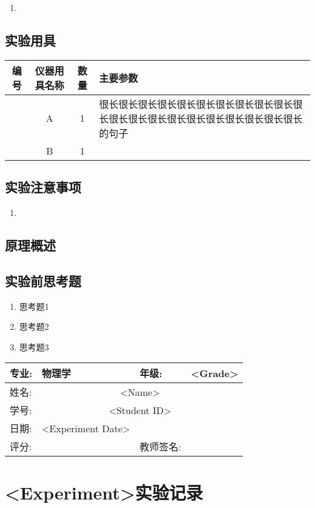 \documentclass{ctexart}
\newcommand{\experimentname}{<Experiment>}
\newcommand{\student}{<Name>}
\newcommand{\Grade}{<Grade>}
\newcommand{\stuID}{<Student ID>}
\newcommand{\experimentdate}{<Experiment Date>}
\theoremstyle{ansstyle}
\newcommand{\experimentdata}{%
    \begin{center}
        \begin{tabular}{|p{2cm}|p{4cm}|p{4cm}|p{4cm}|}
            \hline
            专业:  & 物理学 & 年级:  & \Grade \\
            \hline
            姓名:  & \multicolumn{3}{c|}{\student} \\
            \hline 
            学号:  & \multicolumn{3}{c|}{\stuID} \\
            \hline
            日期:  & \experimentdate & & \\
            \hline
            评分:  &   & 教师签名: & \\
            \hline
        \end{tabular}
    \end{center}%
}
\newcounter{instruCounter}
\newcommand{\instrument}[3]{%
        \stepcounter{instruCounter}\theinstruCounter &%
        #1 &%
        #2 &%
        #3 \\
        \hline
        }
\begin{document}
\begin{enumerate}
    \item 
\end{enumerate}

\subsection{实验用具}
\begin{table}[H]
    \begin{center}
        \begin{tabular}{|c|c|c|m{12cm}|}
            \hline
            编号 & 仪器用具名称 & 数量 & 主要参数 \\
            \hline
            \instrument{A}{1}{很长很长很长很长很长很长很长很长很长很长很长很长很长很长很长很长很长很长很长很长很长的句子} %
            \instrument{B}{1}{}
        \end{tabular}
    \end{center}
    \end{table}

\subsection{实验注意事项}

\begin{enumerate}
    \item 
\end{enumerate}

\subsection{原理概述}


\subsection{实验前思考题}
\begin{enumerate}
    \item 思考题1
    \item 思考题2
    \item 思考题3
\end{enumerate}

\newpage

\experimentdata

\section*{\experimentname 实验记录}
\end{document}
